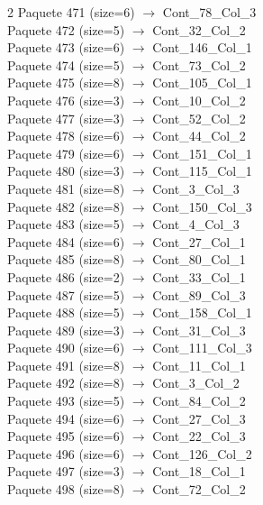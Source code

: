 \begin{multicols}{2}
Paquete 471 (size=6) $\rightarrow$ Cont\_78\_Col\_3\\
Paquete 472 (size=5) $\rightarrow$ Cont\_32\_Col\_2\\
Paquete 473 (size=6) $\rightarrow$ Cont\_146\_Col\_1\\
Paquete 474 (size=5) $\rightarrow$ Cont\_73\_Col\_2\\
Paquete 475 (size=8) $\rightarrow$ Cont\_105\_Col\_1\\
Paquete 476 (size=3) $\rightarrow$ Cont\_10\_Col\_2\\
Paquete 477 (size=3) $\rightarrow$ Cont\_52\_Col\_2\\
Paquete 478 (size=6) $\rightarrow$ Cont\_44\_Col\_2\\
Paquete 479 (size=6) $\rightarrow$ Cont\_151\_Col\_1\\
Paquete 480 (size=3) $\rightarrow$ Cont\_115\_Col\_1\\
Paquete 481 (size=8) $\rightarrow$ Cont\_3\_Col\_3\\
Paquete 482 (size=8) $\rightarrow$ Cont\_150\_Col\_3\\
Paquete 483 (size=5) $\rightarrow$ Cont\_4\_Col\_3\\
Paquete 484 (size=6) $\rightarrow$ Cont\_27\_Col\_1\\
Paquete 485 (size=8) $\rightarrow$ Cont\_80\_Col\_1\\
Paquete 486 (size=2) $\rightarrow$ Cont\_33\_Col\_1\\
Paquete 487 (size=5) $\rightarrow$ Cont\_89\_Col\_3\\
Paquete 488 (size=5) $\rightarrow$ Cont\_158\_Col\_1\\
Paquete 489 (size=3) $\rightarrow$ Cont\_31\_Col\_3\\
Paquete 490 (size=6) $\rightarrow$ Cont\_111\_Col\_3\\
Paquete 491 (size=8) $\rightarrow$ Cont\_11\_Col\_1\\
Paquete 492 (size=8) $\rightarrow$ Cont\_3\_Col\_2\\
Paquete 493 (size=5) $\rightarrow$ Cont\_84\_Col\_2\\
Paquete 494 (size=6) $\rightarrow$ Cont\_27\_Col\_3\\
Paquete 495 (size=6) $\rightarrow$ Cont\_22\_Col\_3\\
Paquete 496 (size=6) $\rightarrow$ Cont\_126\_Col\_2\\
Paquete 497 (size=3) $\rightarrow$ Cont\_18\_Col\_1\\
Paquete 498 (size=8) $\rightarrow$ Cont\_72\_Col\_2\\

\end{multicols}
